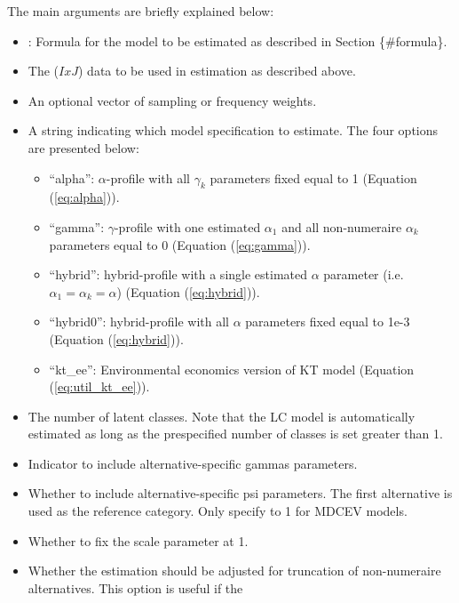 The main arguments are briefly explained below:

\begin{itemize}
\item
  : Formula for the model to be estimated as described in
  Section \{\#formula\}.
\item
   The (\(IxJ\)) data to be used in estimation as described
  above.
\item
   An optional vector of sampling or frequency weights.
\item
   A string indicating which model specification to
  estimate. The four options are presented below:

  \begin{itemize}
  \tightlist
  \item
    ``alpha'': \(\alpha\)-profile with all \(\gamma_k\) parameters fixed
    equal to 1 (Equation (\ref{eq:alpha})).
  \item
    ``gamma'': \(\gamma\)-profile with one estimated \(\alpha_1\) and
    all non-numeraire \(\alpha_k\) parameters equal to 0 (Equation
    (\ref{eq:gamma})).
  \item
    ``hybrid'': hybrid-profile with a single estimated \(\alpha\)
    parameter (i.e.~\(\alpha_1 = \alpha_k = \alpha\)) (Equation
    (\ref{eq:hybrid})).
  \item
    ``hybrid0'': hybrid-profile with all \(\alpha\) parameters fixed
    equal to 1e-3 (Equation (\ref{eq:hybrid})).
  \item
    ``kt\_ee'': Environmental economics version of KT model (Equation
    (\ref{eq:util_kt_ee})).
  \end{itemize}
\item
   The number of latent classes. Note that the LC model
  is automatically estimated as long as the prespecified number of
  classes is set greater than 1.
\item
   Indicator to include alternative-specific gammas
  parameters.
\item
   Whether to include alternative-specific psi
  parameters. The first alternative is used as the reference category.
  Only specify to 1 for MDCEV models.
\item
   Whether to fix the scale parameter at 1.
\item
   Whether the estimation should be adjusted for
  truncation of non-numeraire alternatives. This option is useful if the

\end{itemize}
